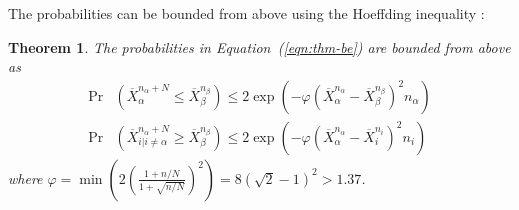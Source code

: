 \documentclass[]{article}
\newtheorem{thm}{Theorem}
\renewcommand{\eqref}[1]{Equation~(\ref{#1})}
\begin{document}
The probabilities can be bounded from above using the
Hoeffding inequality \citep{Hoeffding.ineq}:
\begin{thm} The probabilities in \eqref{eqn:thm-be} are bounded from above as
\begin{align}
  \label{eqn:probound-blnk-hoeffding}
  \Pr&(\overline X_\alpha^{{n_\alpha}+N} \le \overline X_\beta^{n_\beta})
  \le 2\exp\left(- \varphi (\overline X_\alpha^{n_\alpha} - \overline X_\beta^{n_\beta})^2 n_\alpha
  \right)\nonumber\\
  \Pr&(\overline X_{i|i\ne\alpha}^{n_\alpha+N} \ge \overline X_\beta^{n_\beta})
  \le 2\exp\left(- \varphi (\overline X_\alpha^{n_\alpha} -\overline  X_i^{n_i})^2 n_i \right)
\end{align}
where $\varphi=\min \left(2(\frac {1+n/N} {1+\sqrt {n/N}})^2\right)=8(\sqrt 2 - 1)^2 > 1.37$.
\label{thm:hoeffding-prob-bounds}
\end{thm}
\end{document}
